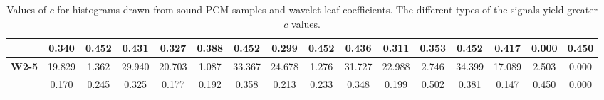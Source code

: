 \begin{table*}[h!]
\begin{center}
\begin{tabular}{| l || c | c | c || c | c | c || c | c | c || c | c | c || c | c | c |}
 & 0.340  & 0.452  & 0.431  & 0.327  & 0.388  & 0.452  & 0.299  & 0.452  & 0.436  & 0.311  & 0.353  & 0.452  & 0.417  & 0.000  & 0.450 \\\hline
{\bf W2-5} & 19.829 & 1.362 & 29.940 & 20.703 & 1.087 & 33.367 & 24.678 & 1.276 & 31.727 & 22.988 & 2.746 & 34.399 & 17.089 & 2.503 & 0.000 \\
 & 0.170  & 0.245  & 0.325  & 0.177  & 0.192  & 0.358  & 0.213  & 0.233  & 0.348  & 0.199  & 0.502  & 0.381  & 0.147  & 0.450  & 0.000 \\\hline
\end{tabular}
\caption{Values of $c$ for histograms drawn from sound PCM samples and wavelet leaf coefficients.
The different types of the signals yield greater $c$ values.}
\end{center}
\end{table*}